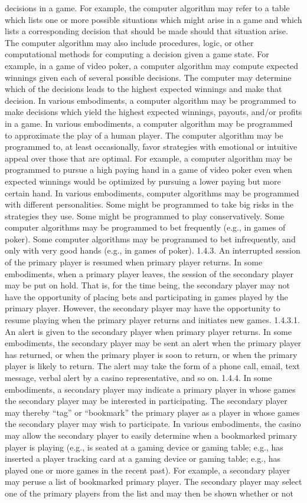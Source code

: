 \documentclass[11pt,a4paper]{article}
\begin{document}
decisions in a game. For example, the computer algorithm may refer to a table which lists one or more possible situations which might arise in a game and which lists a corresponding decision that should be made should that situation arise. The computer algorithm may also include procedures, logic, or other computational methods for computing a decision given a game state. For example, in a game of video poker, a computer algorithm may compute expected winnings given each of several possible decisions. The computer may determine which of the decisions leads to the highest expected winnings and make that decision. In various embodiments, a computer algorithm may be programmed to make decisions which yield the highest expected winnings, payouts, and/or profits in a game. In various embodiments, a computer algorithm may be programmed to approximate the play of a human player. The computer algorithm may be programmed to, at least occasionally, favor strategies with emotional or intuitive appeal over those that are optimal. For example, a computer algorithm may be programmed to pursue a high paying hand in a game of video poker even when expected winnings would be optimized by pursuing a lower paying but more certain hand. In various embodiments, computer algorithms may be programmed with different personalities. Some might be programmed to take big risks in the strategies they use. Some might be programmed to play conservatively. Some computer algorithms may be programmed to bet frequently (e.g., in games of poker). Some computer algorithms may be programmed to bet infrequently, and only with very good hands (e.g., in games of poker). 1.4.3. An interrupted session of the primary player is resumed when primary player returns. In some embodiments, when a primary player leaves, the session of the secondary player may be put on hold. That is, for the time being, the secondary player may not have the opportunity of placing bets and participating in games played by the primary player. However, the secondary player may have the opportunity to resume playing when the primary player returns and initiates new games. 1.4.3.1. An alert is given to the secondary player when primary player returns. In some embodiments, the secondary player may be sent an alert when the primary player has returned, or when the primary player is soon to return, or when the primary player is likely to return. The alert may take the form of a phone call, email, text message, verbal alert by a casino representative, and so on. 1.4.4. In some embodiments, a secondary player may indicate a primary player in whose games the secondary player may be interested in participating. The secondary player may thereby “tag” or “bookmark” the primary player as a player in whose games the secondary player may wish to participate. In various embodiments, the casino may allow the secondary player to easily determine when a bookmarked primary player is playing (e.g., is seated at a gaming device or gaming table; e.g., has inserted a player tracking card at a gaming device or gaming table; e.g., has played one or more games in the recent past). For example, a secondary player may peruse a list of bookmarked primary player. The secondary player may select one of the primary players from the list and may then be shown whether or not 
\end{document}
